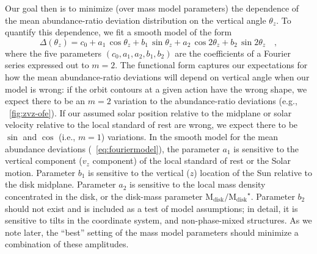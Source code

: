\documentclass[modern]{aastex63}
\newcommand{\mdisk}{\ensuremath{\mathrm{M}_\mathrm{disk}}}
\newcommand{\mratio}{\ensuremath{\mdisk / \mdisk^\star}}
\begin{document}
Our goal then is to minimize (over mass model parameters) the dependence of the
mean abundance-ratio deviation distribution on the vertical angle $\theta_z$.
To quantify this dependence, we fit a smooth model of the form
\begin{equation}
  \Delta(\theta_z) = c_0 + a_1\,\cos  \theta_z + b_1\,\sin    \theta_z
                         + a_2\,\cos 2\theta_z + b_2\,\sin 2\theta_z \quad,
                         \label{eq:fouriermodel}
\end{equation}
where the five parameters $(c_0, a_1, a_2, b_1, b_2)$ are the coefficients of a
Fourier series expressed out to $m=2$.
The functional form captures our expectations for how the mean abundance-ratio
deviations will depend on vertical angle when our model is wrong:
if the orbit contours at a given action have the wrong shape, we expect there to
be an $m=2$ variation to the abundance-ratio deviations (e.g.,
\figurename~\ref{fig:zvz-ofe}).
If our assumed solar position relative to the midplane or solar velocity
relative to the local standard of rest are wrong, we expect there to be $\sin$
and $\cos$ (i.e., $m=1$) variations.
In the smooth model for the mean abundance deviations
(\equationname~\ref{eq:fouriermodel}), the parameter $a_1$ is sensitive to the
vertical component ($v_z$ component) of the local standard of rest or the Solar
motion.
Parameter $b_1$ is sensitive to the vertical ($z$) location of the Sun relative
to the disk midplane.
Parameter $a_2$ is sensitive to the local mass density concentrated in the disk,
or the disk-mass parameter \mratio.
Parameter $b_2$ should not exist and is included as a test of model assumptions;
in detail, it is sensitive to tilts in the coordinate system, and
non-phase-mixed structures.
As we note later, the ``best'' setting of the mass model parameters should
minimize a combination of these amplitudes.
\end{document}
